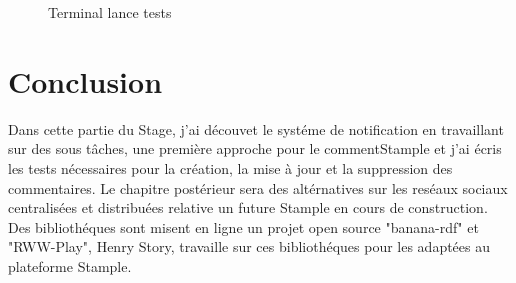 \begin{figure}[H]
\begin{minipage}[c]{.5\linewidth}
\begin{center}
\caption{Terminal lance tests}
\label{fig:Terminal lance tests}
\end{center}
\end{minipage}
\end{figure}

\section{Conclusion}
Dans cette partie du Stage, j'ai découvet le systéme de notification en travaillant sur des sous tâches, une première approche pour le commentStample et j'ai écris les tests nécessaires pour la création, la mise à jour et la suppression des commentaires.
Le chapitre postérieur sera des altérnatives sur les reséaux sociaux centralisées et distribuées relative un future Stample en cours de construction.
Des bibliothéques sont misent en ligne un projet open source "banana-rdf" et "RWW-Play", Henry Story, travaille sur ces bibliothéques pour les adaptées au plateforme Stample.
